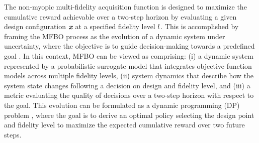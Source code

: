 The non-myopic multi-fidelity acquisition function is designed to maximize the cumulative reward achievable over a two-step horizon by evaluating a given design configuration \(\textbf{\em x}\) at a specified fidelity level \(l\). This is accomplished by framing the MFBO process as the evolution of a dynamic system under uncertainty, where the objective is to guide decision-making towards a predefined goal \cite{DiFioreMaininiNM2BO}. In this context, MFBO can be viewed as comprising: (i) a dynamic system represented by a probabilistic surrogate model that integrates objective function models across multiple fidelity levels, (ii) system dynamics that describe how the system state changes following a decision on design and fidelity level, and (iii) a metric evaluating the quality of decisions over a two-step horizon with respect to the goal.
%
This evolution can be formulated as a dynamic programming (DP) problem \cite{Bertsekas1995, Powell2007}, where the goal is to derive an optimal policy selecting the design point and fidelity level to maximize the expected cumulative reward over two future steps.

